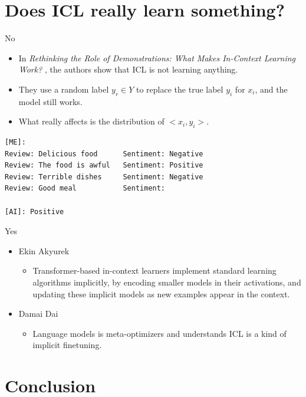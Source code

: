 \documentclass[aspectratio=1610,xcolor={dvipsnames},hyperref={colorlinks,unicode,linkcolor=violet,anchorcolor=BlueViolet,citecolor=YellowOrange,filecolor=black,urlcolor=Aquamarine}]{beamer}
\begin{document}
\section{Does ICL really learn something?}
\label{sec:orgbff0c2e}

\begin{frame}[label={sec:org21beb51},fragile]{No}
 \begin{itemize}
\item In \emph{Rethinking the Role of Demonstrations: What Makes In-Context Learning Work?} , the authors show that ICL is not learning anything.
\item They use a random label \(y_{r} \in Y\) to replace the true label \(y_{i}\) for \(x_{i}\), and the model still works.
\item What really affects is the distribution of \(<x_{i}, y_{i}>\).
\end{itemize}

\begin{verbatim}
[ME]:
Review: Delicious food      Sentiment: Negative
Review: The food is awful   Sentiment: Positive
Review: Terrible dishes     Sentiment: Negative
Review: Good meal           Sentiment:

[AI]: Positive
\end{verbatim}
\end{frame}

\begin{frame}[label={sec:orgcf8e2b2}]{Yes}
\begin{itemize}
\item Ekin Akyurek 
\begin{itemize}
\item Transformer-based in-context learners implement standard learning algorithms implicitly, by encoding smaller models in their activations, and updating these implicit models as new examples appear in the context.
\end{itemize}
\item Damai Dai 
\begin{itemize}
\item Language models is meta-optimizers and understands ICL is a kind of implicit finetuning.
\end{itemize}
\end{itemize}
\end{frame}

\section{Conclusion}
\label{sec:org533377f}
\end{document}

